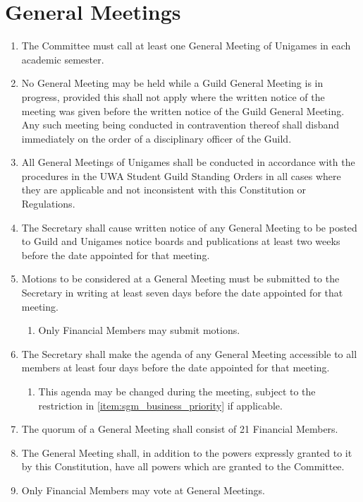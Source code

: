 \documentclass[a4paper]{article}
\begin{document}
\section{General Meetings} \label{sec:general_meetings}
\begin{enumerate}
    \item The Committee must call at least one General Meeting of Unigames in each academic semester.
    \item No General Meeting may be held while a Guild General Meeting is in progress, provided this shall not apply where the written notice of the meeting was given before the written notice of the Guild General Meeting. Any such meeting being conducted in contravention thereof shall disband immediately on the order of a disciplinary officer of the Guild.
    \item All General Meetings of Unigames shall be conducted in accordance with the procedures in the UWA Student Guild Standing Orders in all cases where they are applicable and not inconsistent with this Constitution or Regulations.
    \item The Secretary shall cause written notice of any General Meeting to be posted to Guild and Unigames notice boards and publications at least two weeks before the date appointed for that meeting.
    \item Motions to be considered at a General Meeting must be submitted to the Secretary in writing at least seven days before the date appointed for that meeting.
    \begin{enumerate}
        \item Only Financial Members may submit motions.
    \end{enumerate}
    \item The Secretary shall make the agenda of any General Meeting accessible to all members at least four days before the date appointed for that meeting.
    \begin{enumerate}
        \item This agenda may be changed during the meeting, subject to the restriction in \cref{item:sgm_business_priority} if applicable.
    \end{enumerate}
    \item The quorum of a General Meeting shall consist of 21 Financial Members.
    \item The General Meeting shall, in addition to the powers expressly granted to it by this Constitution, have all powers which are granted to the Committee.
    \item Only Financial Members may vote at General Meetings.

\end{enumerate}
\end{document}
